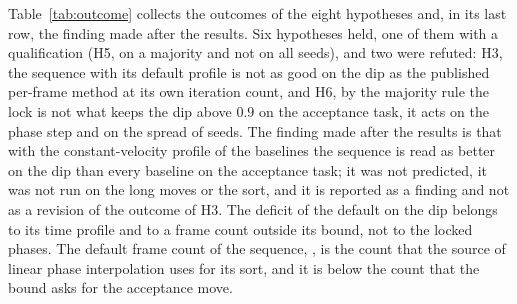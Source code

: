 Table~\ref{tab:outcome} collects the outcomes of the eight hypotheses and, in its last row, the finding made after the results. Six hypotheses held, one of them with a qualification (H5, on a majority and not on all seeds), and two were refuted: H3, the sequence with its default profile is not as good on the dip as the published per-frame method at its own iteration count, and H6, by the majority rule the lock is not what keeps the dip above $0.9$ on the acceptance task, it acts on the phase step and on the spread of seeds. The finding made after the results is that with the constant-velocity profile of the baselines the sequence is read as better on the dip than every baseline on the acceptance task; it was not predicted, it was not run on the long moves or the sort, and it is reported as a finding and not as a revision of the outcome of H3. The deficit of the default on the dip belongs to its time profile and to a frame count outside its bound, not to the locked phases. The default frame count of the sequence, \parFrames{}, is the count that the source of linear phase interpolation uses for its sort, and it is below the count that the bound asks for the acceptance move.
